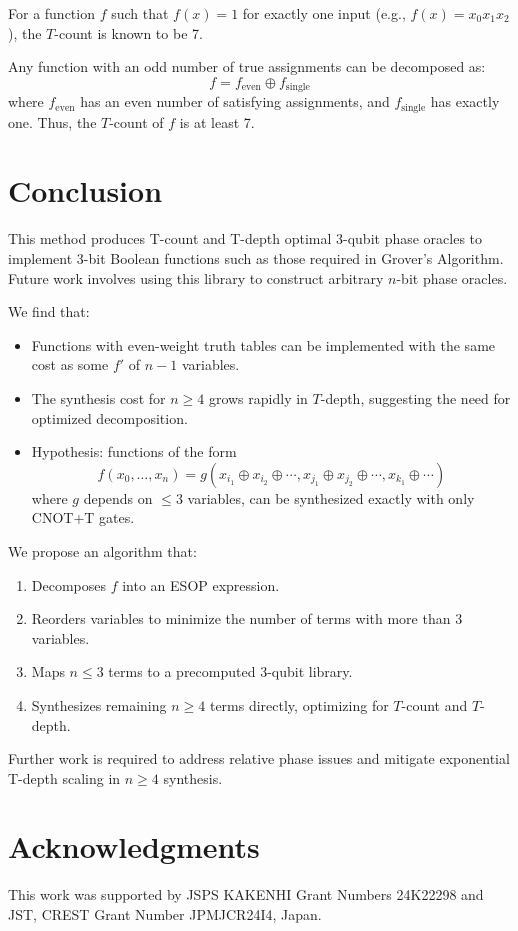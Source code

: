 \documentclass[a4paper]{article}
\begin{document}
For a function $f$ such that $f(x) = 1$ for exactly one input (e.g., $f(x) = x_0 x_1 x_2$), the $T$-count is known to be 7.

Any function with an odd number of true assignments can be decomposed as:
\[
f = f_{\text{even}} \oplus f_{\text{single}}
\]
where $f_{\text{even}}$ has an even number of satisfying assignments, and $f_{\text{single}}$ has exactly one. Thus, the $T$-count of $f$ is at least 7.

\section{Conclusion}
\label{Sec:concl}

This method produces T-count and T-depth optimal 3-qubit phase oracles to implement 3-bit Boolean functions
such as those required in Grover's Algorithm. Future work involves using this library to construct arbitrary
$n$-bit phase oracles.

We find that:
\begin{itemize}
  \item Functions with even-weight truth tables can be implemented with the same cost as some $f'$ of $n-1$ variables.
  \item The synthesis cost for $n \geq 4$ grows rapidly in $T$-depth, suggesting the need for optimized decomposition.
  \item Hypothesis: functions of the form
  \[
  f(x_0,\ldots,x_n) = g(x_{i_1} \oplus x_{i_2} \oplus \cdots, x_{j_1} \oplus x_{j_2} \oplus \cdots, x_{k_1} \oplus \cdots)
  \]
  where $g$ depends on $\leq 3$ variables, can be synthesized exactly with only CNOT+T gates.
\end{itemize}

We propose an algorithm that:
\begin{enumerate}
  \item Decomposes $f$ into an ESOP expression.
  \item Reorders variables to minimize the number of terms with more than 3 variables.
  \item Maps $n \leq 3$ terms to a precomputed 3-qubit library.
  \item Synthesizes remaining $n \geq 4$ terms directly, optimizing for $T$-count and $T$-depth.
\end{enumerate}

Further work is required to address relative phase issues and mitigate exponential T-depth scaling in $n \geq 4$ synthesis.


\section*{Acknowledgments}                                                     
This work was supported by JSPS KAKENHI Grant Numbers 24K22298 and JST, CREST Grant Number JPMJCR24I4, Japan.




\end{document}
